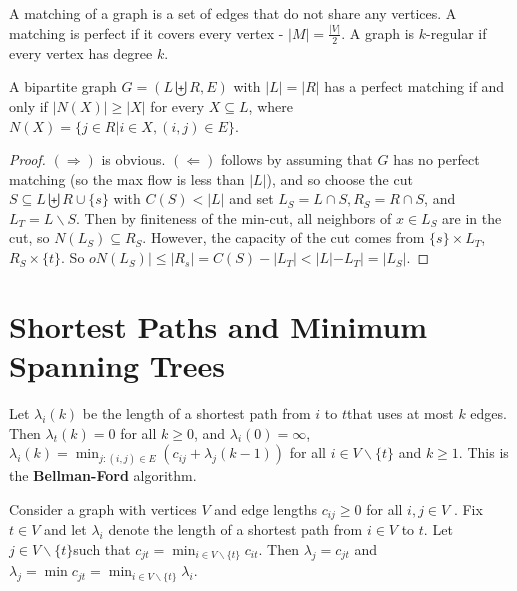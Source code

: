 \begin{defn}
  \label{sec:maxim-flows-perf-6}
  A matching of a graph is a set of edges that do not share any
  vertices.  A matching is perfect if it covers every vertex - $|M| =
  \frac{|V|}{2}$.  A graph is $k$-regular if every vertex has degree $k$.
\end{defn}

\begin{thm}
  \label{sec:maxim-flows-perf-7}
  A bipartite graph $G = (L \biguplus R, E)$ with $|L| = |R|$ has a
  perfect matching if and only if $|N(X)| \geq |X|$ for every $X
  \subseteq L$, where $N(X) = \{ j \in R | i \in X, (i, j) \in E \}$.
\end{thm}

\begin{proof}
  $(\Rightarrow)$ is obvious. $(\Leftarrow)$ follows by assuming that
  $G$ has no perfect matching (so the max flow is less than $|L|$),
  and so choose the cut $S \subseteq L \biguplus R \cup \{ s \}$ with
  $C(S) < |L|$ and set $L_{S} = L \cap S, R_{S} = R \cap S$, and
  $L_{T} = L \backslash S$.  Then by finiteness of the min-cut, all
  neighbors of $x \in L_{S}$ are in the cut, so $N(L_{S}) \subseteq
  R_{S}$.  However, the capacity of the cut comes from $\{ s \}
  \times L_{T}$, $R_{S} \times \{ t \} $.  So $oN(L_{S})| \leq |R_{s}|
  = C(S) - |L_{T}| < |L| - L_{T}| = |L_{S}|$.
\end{proof}

\section{Shortest Paths and Minimum Spanning Trees}
\label{sec:short-paths-minim}

\begin{thm}
  \label{sec:short-paths-minim-1}
  Let $\lambda_{i}(k)$ be the length of a shortest path from $i$ to
  $t$that uses at most $k$ edges.  Then $\lambda_{t}(k) = 0$ for all
  $k \geq 0$, and $\lambda_{i}(0) = \infty$, $\lambda_{i}(k) =
  \min_{j: (i, j) \in E}(c_{ij} + \lambda_{j}(k-1))$ for all $i \in V
  \backslash \{ t \}$ and $k \geq 1$.  This is the
  \textbf{Bellman-Ford} algorithm.
\end{thm}

\begin{thm}
  \label{sec:short-paths-minim-2}
  Consider a graph with vertices $V$ and edge lengths $c_{ij} \geq 0$
  for all $i, j \in V$ . Fix $t \in V$ and let $\lambda_{i}$ denote
  the length of a shortest path from $i \in V$ to $t$.  Let $j \in V
  \backslash \{ t \} $such that $c_{jt} = \min_{i \in V \backslash \{
    t \}} c_{it}$. Then $\lambda_{j} = c_{jt}$ and $\lambda_{j} = \min
  c_{jt} = \min_{i \in V \backslash \{ t \}} \lambda_{i}$.
\end{thm}

